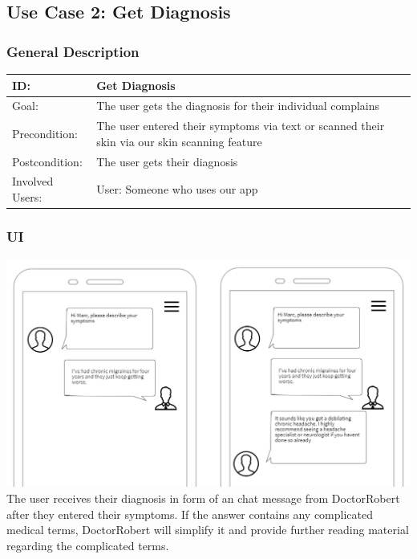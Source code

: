 \subsection{Use Case 2: Get Diagnosis}

 \subsubsection{General Description}
\begin{tabular}{|p{.2\linewidth}|p{.65\linewidth}|}
\hline 
ID: & Get Diagnosis \\ \hline
Goal: & The user gets the diagnosis for their individual complains \\ \hline
Precondition: &  The user entered their symptoms via text or scanned their skin via our skin scanning feature\\ \hline
Postcondition: & The user gets their diagnosis \\ \hline
Involved Users: & User: Someone who uses our app \\ \hline
\end{tabular}

\subsubsection{UI}

\includegraphics[scale=1.2]{SystemSpec/Usecases/Mocks/getdiagnosis01.PNG}\\
The user receives their diagnosis in form of an chat message from DoctorRobert after they entered their symptoms. If the answer contains any complicated medical terms, DoctorRobert will simplify it and provide further reading material regarding the complicated terms.

